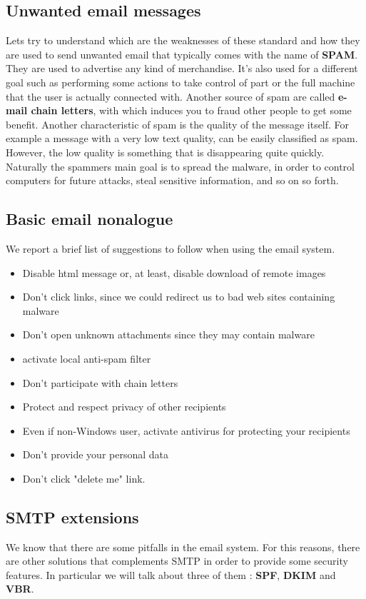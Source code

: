 \subsection{Unwanted email messages}
Lets try to understand which are the weaknesses of these standard and how they are used to send unwanted email that typically comes with the name of \textbf{SPAM}. They are used to advertise any kind of merchandise. It's also used for a different goal such as performing some actions to take control of part or the full machine that the user is actually connected with. Another source of spam are called \textbf{e-mail chain letters}, with which induces you to fraud other people to get some benefit. Another characteristic of spam is the quality of the message itself. For example a message with a very low text quality, can be easily classified as spam. However, the low quality is something that is disappearing quite quickly. Naturally the spammers main goal is to spread the malware, in order to control computers for future attacks, steal sensitive information, and so on so forth.
\subsection{Basic email nonalogue}
We report a brief list of suggestions to follow when using the email system.
\begin{itemize}
\item Disable html message or, at least, disable download of remote images
\item Don't click links, since we could redirect us to bad web sites containing malware
\item Don't open unknown attachments since they may contain malware
\item activate local anti-spam filter
\item Don't participate with chain letters
\item Protect and respect privacy of other recipients
\item Even if non-Windows user, activate antivirus for protecting your recipients
\item Don't provide your personal data
\item Don't click "delete me" link.
\end{itemize}
\subsection{SMTP extensions}
We know that there are some pitfalls in the email system. For this reasons, there are other solutions that complements SMTP in order to provide some security features. In particular we will talk about three of them : \textbf{SPF}, \textbf{DKIM} and \textbf{VBR}.

